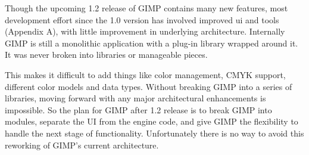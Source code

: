 Though the upcoming 1.2 release of GIMP contains many new features, most
development effort since the 1.0 version has involved improved ui and tools
(Appendix A), with little improvement in underlying architecture. Internally
GIMP is still a monolithic application with a plug-in library wrapped around
it. It was never broken into libraries or manageable pieces. 

This makes it difficult to add things like color management, CMYK support,
different color models and data types. Without breaking GIMP into a series of
libraries, moving forward with any major architectural enhancements is
impossible. So the plan for GIMP after 1.2 release is to break GIMP into
modules, separate the UI from the engine code, and give GIMP the flexibility to
handle the next stage of functionality. Unfortunately there is no way to avoid
this reworking of GIMP's current architecture.
